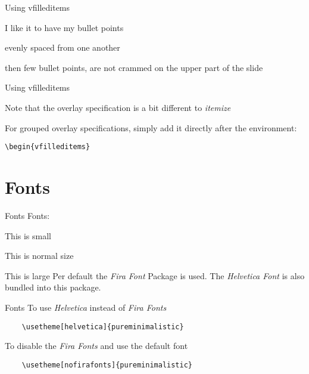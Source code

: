 \documentclass[aspectratio=169]{beamer}
\begin{document}
\begin{frame}{Using vfilleditems}
  \begin{vfilleditems}
    \item I like it to have my bullet points
    \item evenly spaced from one another
    \item then few bullet points, are not crammed on
    the upper part of the slide
  \end{vfilleditems}
\end{frame}

\begin{frame}{Using vfilleditems}
  \begin{vfilleditems}
    \item Note that the overlay specification
    is a bit different to \emph{itemize}
    \item For grouped overlay specifications, simply add it
    directly after the environment:
    \begin{vfilleditems}
      \item \texttt{\textbackslash{}begin\{vfilleditems\}<+->}
    \end{vfilleditems}
  \end{vfilleditems}
\end{frame}


\section{Fonts}
\begin{frame}[fragile]{Fonts}
  Fonts:

  {\small This is small}

  This is normal size

    {\large This is large}
  \vfill
  Per default the \emph{Fira Font} Package is
  used. The \emph{Helvetica Font} is also bundled into this
  package.
\end{frame}

\begin{frame}[fragile]{Fonts}
  To use \emph{Helvetica} instead of \emph{Fira Fonts}
  \begin{verbatim}
    \usetheme[helvetica]{pureminimalistic}
  \end{verbatim}
  \vfill
  To disable the \emph{Fira Fonts} and use the default font
  \begin{verbatim}
    \usetheme[nofirafonts]{pureminimalistic}
  \end{verbatim}
\end{frame}
\end{document}

